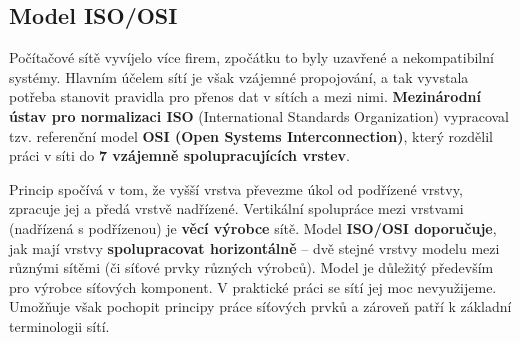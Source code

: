 \subsection{Model ISO/OSI}
Počítačové sítě vyvíjelo více firem, zpočátku to byly uzavřené a nekompatibilní systémy. Hlavním účelem sítí je však vzájemné propojování, a tak vyvstala potřeba stanovit pravidla pro přenos dat v sítích a mezi nimi. \textbf{Mezinárodní ústav pro normalizaci ISO} (International Standards Organization) vypracoval tzv. referenční model \textbf{OSI (Open Systems Interconnection)}, který rozdělil práci v síti do \textbf{7 vzájemně spolupracujících vrstev}.

Princip spočívá v tom, že vyšší vrstva převezme úkol od podřízené vrstvy, zpracuje jej a předá vrstvě nadřízené. Vertikální spolupráce mezi vrstvami (nadřízená s podřízenou) je \textbf{věcí výrobce} sítě. Model \textbf{ISO/OSI doporučuje}, jak mají vrstvy \textbf{spolupracovat horizontálně} – dvě stejné vrstvy modelu mezi různými sítěmi (či síťové prvky různých výrobců). Model je důležitý především pro výrobce síťových komponent. V praktické práci se sítí jej moc nevyužijeme. Umožňuje však pochopit principy práce síťových prvků a zároveň patří k základní terminologii sítí.

